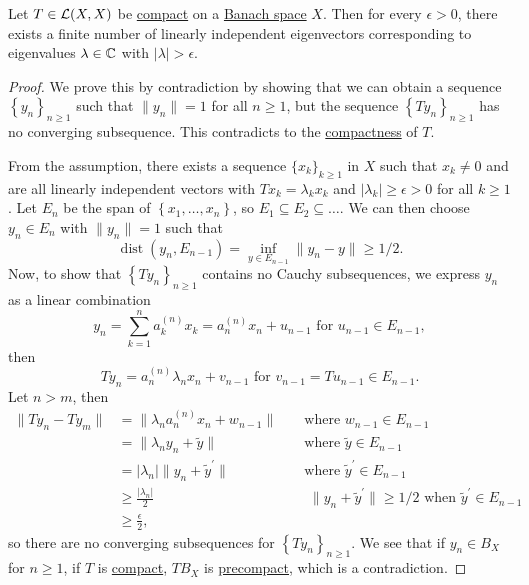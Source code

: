 \begin{theorem}\label{thm:point-spectrum-of-compact-op}
	Let \(T\in \mathcal{\MakeUppercase{l}} (X, X)\) be \hyperref[def:compact-op]{compact} on a \hyperref[def:Banach-space]{Banach space} \(X\). Then for every \(\epsilon > 0\), there exists a finite number of linearly independent eigenvectors corresponding to eigenvalues \(\lambda \in \mathbb{\MakeUppercase{c}} \) with \(\vert \lambda  \vert > \epsilon \).
\end{theorem}
\begin{proof}
	We prove this by contradiction by showing that we can obtain a sequence \(\left\{ y_n \right\} _{n\geq 1}\) such that \(\lVert y_n \rVert = 1\) for all \(n\geq 1\), but the sequence \(\left\{ Ty_n \right\} _{n\geq 1}\) has no converging subsequence. This contradicts to the \hyperref[def:compact-op]{compactness} of \(T\).

	From the assumption, there exists a sequence \(\{x_k\}_{k\geq 1}\) in \(X\) such that \(x_k \neq 0\) and are all linearly independent vectors with \(Tx_k = \lambda _k x_k\) and \(\vert \lambda _k \vert \geq \epsilon > 0\) for all \(k\geq 1\). Let \(E_n\) be the span of \(\left\{ x_1, \ldots , x_n \right\}\), so \(E_1 \subseteq E_2 \subseteq \ldots \). We can then choose \(y_n \in E_n\) with \(\lVert y_n \rVert = 1\) such that
	\[
		\mathop{\mathrm{dist}}(y_n, E_{n-1}) = \inf _{y\in E_{n-1}} \lVert y_n - y \rVert \geq 1 / 2.
	\]
	Now, to show that \(\left\{ Ty_n \right\} _{n\geq 1}\) contains no Cauchy subsequences, we express \(y_n\) as a linear combination
	\[
		y_n = \sum_{k=1}^{n} a_k^{(n)} x_k = a_n ^{(n)} x_n + u_{n-1} \text{ for \(u_{n-1} \in E_{n-1}\)} ,
	\]
	then
	\[
		Ty_n = a_n^{(n)} \lambda _n x_n + v_{n-1} \text{ for \(v_{n-1} = Tu_{n-1}\in E_{n-1}\)}.
	\]
	Let \(n > m\), then
	\[
		\begin{aligned}
			\lVert Ty_n - Ty_m \rVert
			 & = \lVert \lambda _n a_n ^{(n)} x_n + w_{n-1}\rVert                 &  & \text{ where \(w_{n-1} \in E_{n-1}\)}                                                                       \\
			 & = \lVert \lambda _n y_n + \widetilde{y}  \rVert                    &  & \text{ where \(\widetilde{y} \in E_{n-1}\)}                                                                 \\
			 & = \vert \lambda _n \vert \lVert y_n + \widetilde{y} ^\prime \rVert &  & \text{ where \(\widetilde{y} ^\prime \in E_{n-1}\)}                                                         \\
			 & \geq \frac{\vert \lambda _n \vert }{2}                             &  & \text{ \(\lVert y_n + \widetilde{y} ^\prime  \rVert \geq 1 / 2\) when \(\widetilde{y}^\prime \in E_{n-1}\)} \\
			 & \geq \frac{\epsilon}{2},
		\end{aligned}
	\]
	so there are no converging subsequences for \(\left\{ Ty_n \right\} _{n\geq 1}\). We see that if \(y_n\in B_X\) for \(n\geq 1\), if \(T\) is \hyperref[def:compact-op]{compact}, \(TB_X\) is \hyperref[def:precompact]{precompact}, which is a contradiction.
\end{proof}

